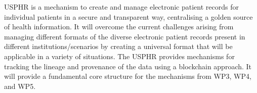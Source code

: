 USPHR is a mechanism to create and manage electronic patient records for individual patients in a secure and transparent way, centralising a golden source of health information. It will overcome the current challenges arising from managing different formats of the diverse electronic patient records present in different institutions/scenarios by creating a universal format that will be applicable in a variety of situations. The USPHR provides mechanisms for tracking the lineage and provenance of the data using a blockchain approach. It will provide a fundamental core structure for the mechanisms from WP3, WP4, and WP5.